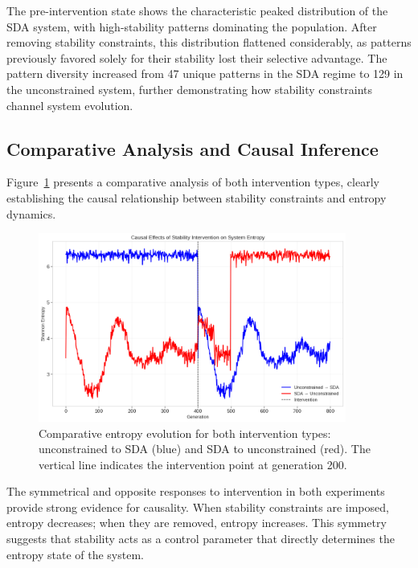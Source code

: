 \documentclass[preprint,12pt]{elsarticle}
\begin{document}
The pre-intervention state shows the characteristic peaked distribution of the SDA system, with high-stability patterns dominating the population. After removing stability constraints, this distribution flattened considerably, as patterns previously favored solely for their stability lost their selective advantage. The pattern diversity increased from 47 unique patterns in the SDA regime to 129 in the unconstrained system, further demonstrating how stability constraints channel system evolution.

\subsection{Comparative Analysis and Causal Inference}
\label{subsec:comparative-analysis}

Figure~\ref{fig:combined-entropy} presents a comparative analysis of both intervention types, clearly establishing the causal relationship between stability constraints and entropy dynamics.

\begin{figure}[h]
    \centering
    \includegraphics[width=0.9\textwidth]{combined_interventions.png}
    \caption{Comparative entropy evolution for both intervention types: unconstrained to SDA (blue) and SDA to unconstrained (red). The vertical line indicates the intervention point at generation 200.}
    \label{fig:combined-entropy}
\end{figure}

The symmetrical and opposite responses to intervention in both experiments provide strong evidence for causality. When stability constraints are imposed, entropy decreases; when they are removed, entropy increases. This symmetry suggests that stability acts as a control parameter that directly determines the entropy state of the system.
\end{document}
